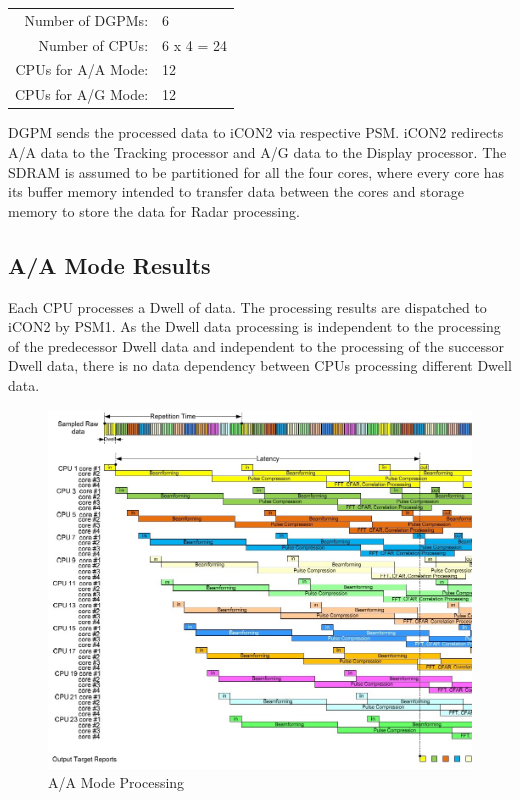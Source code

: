 \begin{tabular}{rl}
	Number of DGPMs: & 6 \\
	Number of CPUs: & 6 x 4 = 24 \\
	CPUs for A/A Mode: & 12 \\
	CPUs for A/G Mode: & 12 \\
\end{tabular}

\noindent
DGPM sends the processed data to iCON2 via respective PSM. iCON2 redirects A/A data to the Tracking processor and A/G data to the Display processor. The SDRAM is assumed to be partitioned for all the four cores, where every core has its buffer memory intended to transfer data between the cores and storage memory to store the data for Radar processing.

\subsection{A/A Mode Results}
\label{ss:scheme1:aa}
Each CPU processes a Dwell of data. The processing results are dispatched to iCON2 by PSM1. As the Dwell data processing is independent to the processing of the predecessor Dwell data and independent to the processing of the successor Dwell data, there  is no data dependency between CPUs processing different Dwell data.

\begin{figure}[h!]
	\centering
	\includegraphics[width=140mm]{figures/aa_scheme1}
	\caption{A/A Mode Processing}
	\label{fig:existing_analysis:aa_scheme1}
\end{figure}


